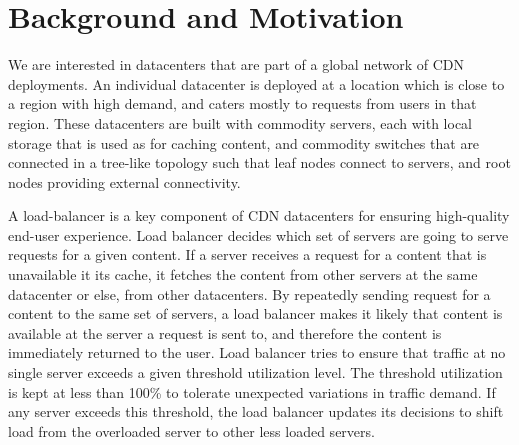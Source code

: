 \section{Background and Motivation}
\label{sec:background}

We are interested in datacenters that are part of a global network of CDN deployments. An individual datacenter is deployed at a location which is close to a region with high demand, and caters mostly to requests from users in that region. 
These datacenters are built with commodity servers, each with local storage that is used as for caching content, and commodity switches that are connected in a tree-like topology such that leaf nodes connect to servers, and root nodes providing external connectivity.


A load-balancer is a key component of CDN datacenters for ensuring high-quality end-user experience. Load balancer decides which set of servers are going to serve requests for a given content. 
If a server receives a request for a content that is unavailable it its cache, it fetches the content from other servers at the same datacenter or else, from other datacenters. 
By repeatedly sending request for a content to the same set of servers, a load balancer makes it likely that content is available at the server a request is sent to, and therefore the content is immediately returned to the user. Load balancer tries to ensure that traffic at no single server exceeds a given threshold utilization level. The threshold utilization is kept at less than 100\% to tolerate unexpected variations in traffic demand. If any server exceeds this threshold, the load balancer updates its decisions to shift load from the overloaded server to other less loaded servers.


